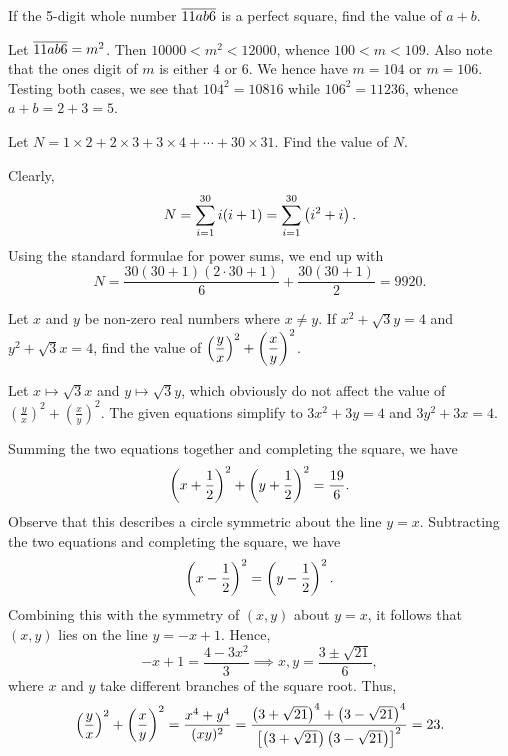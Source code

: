 \begin{question}[5]\label{Q::2024-J-1-12}
    If the 5-digit whole number $\overline{11ab6}$ is a perfect square, find the value of $a + b$.
\end{question}
\begin{solution*}
    Let $\overline{11ab6} = m^2$. Then $10000 < m^2 < 12000$, whence $100 < m < 109$. Also note that the ones digit of $m$ is either 4 or 6. We hence have $m = 104$ or $m = 106$. Testing both cases, we see that $104^2 = 10816$ while $106^2 = 11236$, whence $a + b = 2 + 3 = 5$.
\end{solution*}

\begin{question}[9920]\label{Q::2024-J-1-13}
    Let $N = 1 \times 2 + 2 \times 3 + 3 \times 4 + \cdots + 30 \times 31$. Find the value of $N$.
\end{question}
\begin{solution*}
    Clearly, \[N = \sum_{i = 1}^{30} i(i + 1) = \sum_{i = 1}^{30} \left( i^2 + i \right).\] Using the standard formulae for power sums, we end up with \[N = \frac{30(30 + 1)(2 \cdot 30 + 1)}{6} + \frac{30(30 + 1)}{2} = 9920.\]
\end{solution*}

\clearpage
\begin{question}[23]\label{Q::2024-J-1-14}
    Let $x$ and $y$ be non-zero real numbers where $x \neq y$. If $x^2 + \sqrt3 y = 4$ and $y^2 + \sqrt3 x = 4$, find the value of $\left( \dfrac{y}{x} \right)^2 + \left( \dfrac{x}{y} \right)^2$.
\end{question}
\begin{solution*}
    Let $x \mapsto \sqrt3 x$ and $y \mapsto \sqrt 3 y$, which  obviously do not affect the value of $(\frac{y}{x})^2 + (\frac{x}{y})^2$. The given equations simplify to $3x^2 + 3y = 4$ and $3y^2 + 3x = 4$. 
    
    Summing the two equations together and completing the square, we have \[\left( x + \frac12 \right)^2 + \left( y + \frac12 \right)^2 = \frac{19}{6}.\] Observe that this describes a circle symmetric about the line $y = x$. Subtracting the two equations and completing the square, we have \[\left( x - \frac12 \right)^2 = \left( y - \frac12 \right)^2.\]  Combining this with the symmetry of $(x, y)$ about $y = x$, it follows that $(x, y)$ lies on the line $y = -x + 1$. Hence, \[-x + 1 = \frac{4 - 3x^2}{3} \implies x,y = \frac{3 \pm \sqrt{21}}{6},\] where $x$ and $y$ take different branches of the square root. Thus, \[\left( \frac{y}{x} \right)^2 + \left( \frac{x}{y} \right)^2 = \frac{x^4 + y^4}{(xy)^2} = \frac{\left( 3 + \sqrt{21} \right)^4 + \left( 3 - \sqrt{21} \right)^4}{\left[ \left( 3 + \sqrt{21} \right)\left( 3 - \sqrt{21} \right) \right]^2} = 23.\]
\end{solution*}

